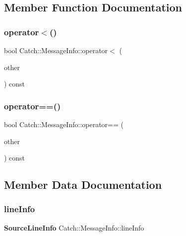 \subsection{Member Function Documentation}
\mbox{\label{struct_catch_1_1_message_info_a8254cb8fca2da02a29a9843cdcb79df1}} 
\subsubsection{operator$<$()}
{\footnotesize\ttfamily bool Catch\+::\+Message\+Info\+::operator$<$ (\begin{DoxyParamCaption}\item[{\textbf{ Message\+Info} const \&}]{other }\end{DoxyParamCaption}) const\hspace{0.3cm}{\ttfamily [inline]}}

\mbox{\label{struct_catch_1_1_message_info_af4b37f2172ba55395813b4bb6bbbde1a}} 
\subsubsection{operator==()}
{\footnotesize\ttfamily bool Catch\+::\+Message\+Info\+::operator== (\begin{DoxyParamCaption}\item[{\textbf{ Message\+Info} const \&}]{other }\end{DoxyParamCaption}) const\hspace{0.3cm}{\ttfamily [inline]}}



\subsection{Member Data Documentation}
\mbox{\label{struct_catch_1_1_message_info_a985165328723e599696ebd8e43195cc5}} 
\subsubsection{line\+Info}
{\footnotesize\ttfamily \textbf{ Source\+Line\+Info} Catch\+::\+Message\+Info\+::line\+Info}

